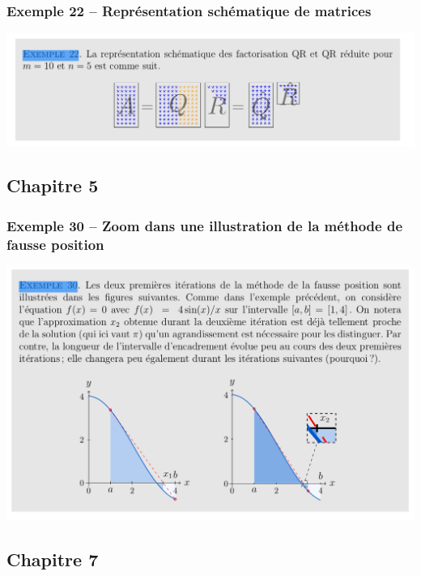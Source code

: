 \documentclass[12pt, a4paper]{article}
\begin{document}
\subsubsection{Exemple 22 -- Représentation schématique de matrices}
\begin{center}
\includegraphics[scale=0.4]{images/MATH-H202_Exemple_22}
\end{center}
\subsection{Chapitre 5}
\subsubsection{Exemple 30 -- Zoom dans une illustration de la méthode de fausse position}
\begin{center}
\includegraphics[scale=0.4]{images/MATH-H202_Exemple_30}
\end{center}

\subsection{Chapitre 7}
\end{document}
